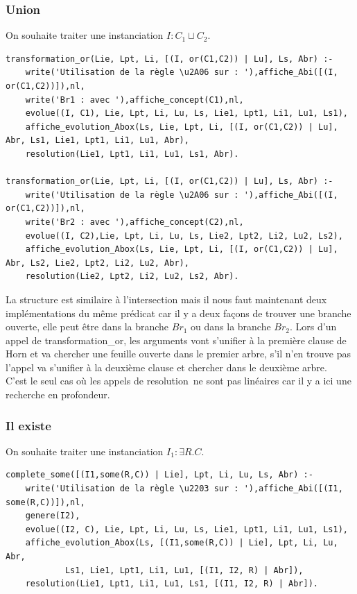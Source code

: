\documentclass{article}
\begin{document}
\subsubsection{Union}
On souhaite traiter une instanciation $I:C_1\sqcup C_2$.
\begin{verbatim}
transformation_or(Lie, Lpt, Li, [(I, or(C1,C2)) | Lu], Ls, Abr) :- 
	write('Utilisation de la règle \u2A06 sur : '),affiche_Abi([(I, or(C1,C2))]),nl,
	write('Br1 : avec '),affiche_concept(C1),nl,
	evolue((I, C1), Lie, Lpt, Li, Lu, Ls, Lie1, Lpt1, Li1, Lu1, Ls1),
	affiche_evolution_Abox(Ls, Lie, Lpt, Li, [(I, or(C1,C2)) | Lu], Abr, Ls1, Lie1, Lpt1, Li1, Lu1, Abr),
	resolution(Lie1, Lpt1, Li1, Lu1, Ls1, Abr).
	
transformation_or(Lie, Lpt, Li, [(I, or(C1,C2)) | Lu], Ls, Abr) :- 
	write('Utilisation de la règle \u2A06 sur : '),affiche_Abi([(I, or(C1,C2))]),nl,
	write('Br2 : avec '),affiche_concept(C2),nl,
	evolue((I, C2),Lie, Lpt, Li, Lu, Ls, Lie2, Lpt2, Li2, Lu2, Ls2),
	affiche_evolution_Abox(Ls, Lie, Lpt, Li, [(I, or(C1,C2)) | Lu], Abr, Ls2, Lie2, Lpt2, Li2, Lu2, Abr),
	resolution(Lie2, Lpt2, Li2, Lu2, Ls2, Abr).
\end{verbatim}

La structure est similaire à l'intersection mais il nous faut maintenant deux implémentations du même prédicat car il y a deux façons de trouver une branche ouverte, elle peut être dans la branche $Br_1$ ou dans la branche $Br_2$. Lors d'un appel de \color{blue}transformation\_or\color{black}, les arguments vont s'unifier à la première clause de Horn et va chercher une feuille ouverte dans le premier arbre, s'il n'en trouve pas l'appel va s'unifier à la deuxième clause et chercher dans le deuxième arbre. \\

C'est le seul cas où les appels de \color{blue}resolution\color{black}\ ne sont pas linéaires car il y a ici une recherche en profondeur.
\subsubsection{Il existe}
On souhaite traiter une instanciation $I_1:\exists R.C$.
\begin{verbatim}
complete_some([(I1,some(R,C)) | Lie], Lpt, Li, Lu, Ls, Abr) :-
	write('Utilisation de la règle \u2203 sur : '),affiche_Abi([(I1, some(R,C))]),nl,
	genere(I2),
	evolue((I2, C), Lie, Lpt, Li, Lu, Ls, Lie1, Lpt1, Li1, Lu1, Ls1),
	affiche_evolution_Abox(Ls, [(I1,some(R,C)) | Lie], Lpt, Li, Lu, Abr,
            Ls1, Lie1, Lpt1, Li1, Lu1, [(I1, I2, R) | Abr]),
	resolution(Lie1, Lpt1, Li1, Lu1, Ls1, [(I1, I2, R) | Abr]).
\end{verbatim}
\end{document}
